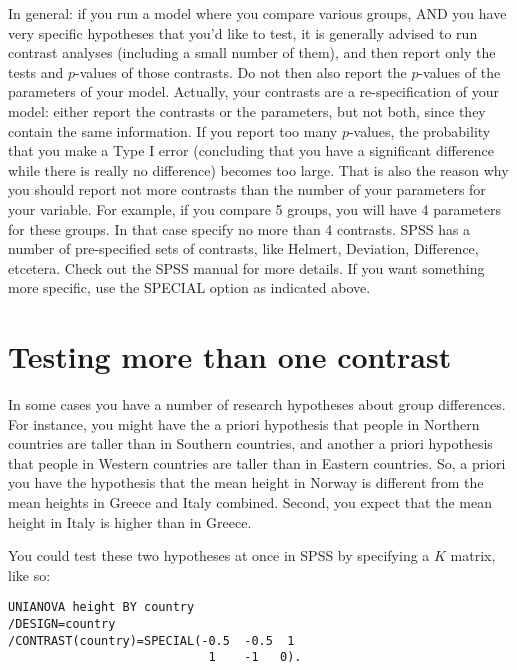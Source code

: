 In general: if you run a model where you compare various groups, AND you have very specific hypotheses that you'd like to test, it is generally advised to run contrast analyses (including a small number of them), and then report only the tests and $p$-values of those contrasts. Do not then also report the $p$-values of the parameters of your model. Actually, your contrasts are a re-specification of your model: either report the contrasts or the parameters, but not both, since they contain the same information. If you report too many $p$-values, the probability that you make a Type I error (concluding that you have a significant difference while there is really no difference) becomes too large. That is also the reason why you should report not more contrasts than the number of your parameters for your variable. For example, if you compare 5 groups, you will have 4 parameters for these groups. In that case specify no more than 4 contrasts. SPSS has a number of pre-specified sets of contrasts, like Helmert, Deviation, Difference, etcetera. Check out the SPSS manual for more details. If you want something more specific, use the SPECIAL option as indicated above. 


\section{Testing more than one contrast}

In some cases you have a number of research hypotheses about group differences. For instance, you might have the a priori hypothesis that people in Northern countries are taller than in Southern countries, and another a priori hypothesis that people in Western countries are taller than in Eastern countries. So, a priori you have the hypothesis that the mean height in Norway is different from the mean heights in Greece and Italy combined. Second, you expect that the mean height in Italy is higher than in Greece.

You could test these two hypotheses at once in SPSS by specifying a $K$ matrix, like so:

\begin{verbatim}
UNIANOVA height BY country
/DESIGN=country
/CONTRAST(country)=SPECIAL(-0.5  -0.5  1
                            1    -1   0).
\end{verbatim}

